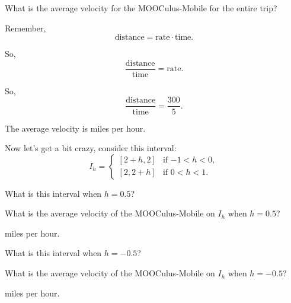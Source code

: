 \documentclass{ximera}
\begin{document}
\begin{problem}
  What is the average velocity for the MOOCulus-Mobile for the entire trip? 
\begin{hint}
  Remember, 
  \[
  \text{distance} = \text{rate}\cdot\text{time}.
  \]
\end{hint}
\begin{hint}
  So, 
  \[
  \frac{\text{distance}}{\text{time}} = \text{rate}.
  \]
\end{hint}
\begin{hint}
So, 
\[
\frac{\text{distance}}{\text{time}} = \frac{300}{5}.
\]
\end{hint}
\begin{prompt}
  The average velocity is  miles per hour.
\end{prompt}
\end{problem}

Now let's get a bit crazy, consider this interval:
\[
I_h = 
\begin{cases}
  [2+h,2]  & \text{if $-1<h<0$}, \\ %
  [2,2+h]  & \text{if $0<h<1$}.     %
\end{cases}
\]


\begin{problem}
  What is this interval when $h = 0.5$?
\end{problem}

\begin{problem}
  What is the average velocity of the MOOCulus-Mobile on $I_h$ when $h =
  0.5$?
  \begin{prompt} %
     miles per hour.
  \end{prompt}
\end{problem}

\begin{problem}
  What is this interval when $h = -0.5$?
\end{problem}

\begin{problem}
  What is the average velocity of the MOOCulus-Mobile on $I_h$ when $h =
  -0.5$?
  \begin{prompt} %
     miles per hour.
  \end{prompt}
\end{problem}
\end{document}
